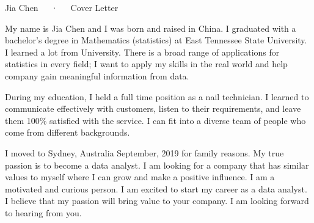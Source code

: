 \documentclass[11pt, a4paper]{awesome-cv}
\begin{document}
\makecvheader[R]

\makecvfooter
  {}
  {Jia Chen~~~·~~~Cover Letter}
  {}

\makelettertitle

\begin{cvletter}

My name is Jia Chen and I was born and raised in China. I graduated with a bachelor’s degree in Mathematics (statistics) at East Tennessee State University. I learned a lot from University. There is a broad range of applications for statistics in every field; I want to apply my skills in the real world and help company gain meaningful information from data.

During my education, I held a full time position as a nail technician. I learned to communicate effectively with customers, listen to their requirements, and leave them 100\% satisfied with the service. I can fit into a diverse team of people who come from different backgrounds.

I  moved to Sydney, Australia September, 2019 for family reasons. My true passion is to become a data analyst. I am looking for a company that has similar values to myself where I can grow and make a positive influence. I am a motivated and curious person. I am excited to start my career as a data analyst. I believe that my passion will bring value to your company. I am looking forward to hearing from you.
\end{cvletter}


\makeletterclosing
\end{document}
